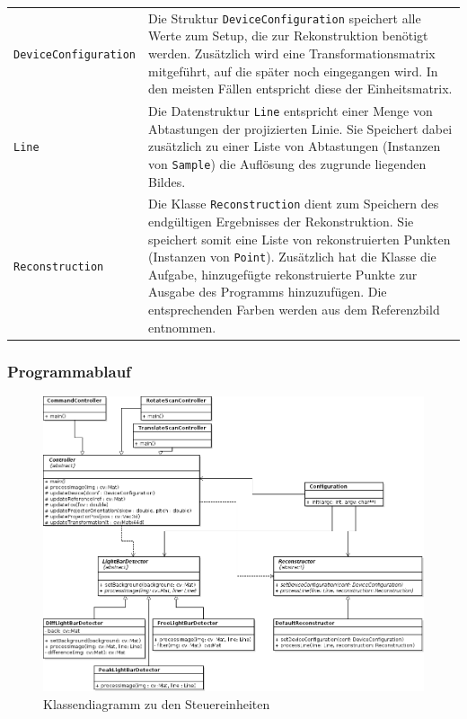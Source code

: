 \documentclass[ngerman,a4paper,parskip=half]{scrartcl}
\begin{document}
\vspace{0.5em}
\begin{tabular}{lp{10cm}}
	\texttt{DeviceConfiguration} &
		Die Struktur \texttt{DeviceConfiguration} speichert alle Werte zum Setup, die zur Rekonstruktion benötigt werden. Zusätzlich wird eine Transformationsmatrix mitgeführt, auf die später noch eingegangen wird. In den meisten Fällen entspricht diese der Einheitsmatrix.\\[1em]
	\texttt{Line}                &
		Die Datenstruktur \texttt{Line} entspricht einer Menge von Abtastungen der projizierten Linie. Sie Speichert dabei zusätzlich zu einer Liste von Abtastungen (Instanzen von \texttt{Sample}) die Auflösung des zugrunde liegenden Bildes.\\[1em]
	\texttt{Reconstruction}      &
		Die Klasse \texttt{Reconstruction} dient zum Speichern des endgültigen Ergebnisses der Rekonstruktion. Sie speichert somit eine Liste von rekonstruierten Punkten (Instanzen von \texttt{Point}). Zusätzlich hat die Klasse die Aufgabe, hinzugefügte rekonstruierte Punkte zur Ausgabe des Programms hinzuzufügen. Die entsprechenden Farben werden aus dem Referenzbild entnommen.
\end{tabular}

\subsubsection{Programmablauf}

\begin{figure}
	\centering
	\includegraphics[width=\linewidth]{includes/classdiagram_control.png}
	\caption{Klassendiagramm zu den Steuereinheiten}
	\label{fig:classes_control}
\end{figure}
\end{document}
